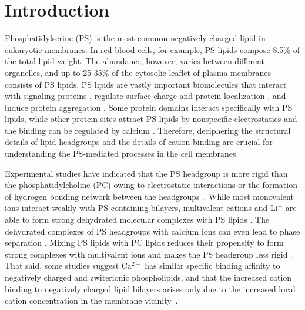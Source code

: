\documentclass[aps,prl,superscriptaddress,twocolumn]{revtex4}
\begin{document}


\section{Introduction}
Phosphatidylserine (PS) is the most common negatively
charged lipid in eukaryotic membranes. In red blood cells, for example,
PS lipids compose 8.5\% of the total lipid weight. 
The abundance, however, varies between different organelles, and up to
25-35\% of the cytosolic leaflet of plasma membranes \cite{lemmon08,leventis10,li14} consists of PS lipids.
PS lipids are vastly important biomolecules that interact with
signaling proteins \cite{leventis10}, regulate
surface charge and protein localization \cite{yeung08}, and
induce protein aggregation \cite{zhao04,gorbenko06}.
Some protein domains interact specifically with PS lipids,
while other protein sites attract PS lipids by nonspecific electrostatics and the
binding can be regulated by calcium \cite{leventis10}.
Therefore, deciphering the structural details
of lipid headgroups and the details of cation binding
are crucial for understanding the PS-mediated processes in the cell membranes.

Experimental studies have indicated that the
PS headgroup is more rigid than the phosphatidylcholine (PC)
owing to electrostatic interactions or the formation of hydrogen bonding network between the headgroups~\cite{browning80,buldt81}.
While most monovalent ions interact weakly with
PS-containing bilayers, multivalent cations and Li$^+$ are able to form strong
dehydrated molecular complexes with PS lipids \cite{hauser77,kurland79,eisenberg79,hauser83,dluhy83,hauser85,feigenson86,mattai89,roux90,roux91,boettcher11}.
The dehydrated complexes of PS headgroups with calcium ions can even lead to
phase separation \cite{hauser77,kurland79,hauser85,feigenson86,mattai89,roux90,roux91}. Mixing PS lipids with PC lipids reduces their propensity to form strong complexes with multivalent ions and makes the PS headgroup less rigid~\cite{browning80,buldt81,roux90,roux91}.
That said, some studies suggest Ca$^{2+}$ has similar specific binding affinity 
to negatively charged and zwiterionic phospholipids, and that
the increased cation binding to negatively charged lipid bilayers arises only due
to the increased local cation concentration in the membrane vicinity~\cite{seelig90,sinn06}. 
\end{document}
